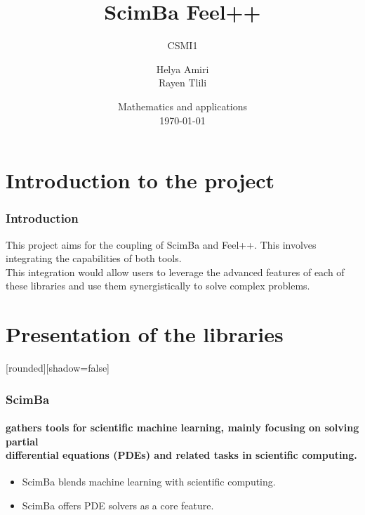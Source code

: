 \documentclass[10pt]{beamer}
\title{ScimBa Feel++}
\subtitle{CSMI1}
\author{ Helya Amiri \\ Rayen Tlili }
\institute[]{University of Strasbourg \\ \smallskip}
\date[\today]{Mathematics and applications \\ \today}
\begin{document}
\frame{\titlepage}
\begin{frame}
    \tableofcontents
\end{frame}

\section{Introduction to the project}
\begin{frame}
    \frametitle{Introduction}
    This project aims for the coupling of ScimBa and Feel++. This involves integrating the capabilities of both tools. 
    \\This integration would allow users to leverage the advanced features of each of these libraries and use them synergistically to solve complex problems.
\end{frame}


\section{Presentation of the libraries}
\begin{frame}
    [rounded][shadow=false]
    \frametitle{ScimBa}
    \framesubtitle{ gathers tools for scientific machine learning, mainly focusing on solving partial  \\  differential equations (PDEs) and related tasks in scientific computing.}

    \begin{itemize}
        \item ScimBa blends machine learning with scientific computing. 
        

        \item ScimBa offers PDE solvers as a core feature. 
        
    \end{itemize}
\end{frame}
\end{document}
